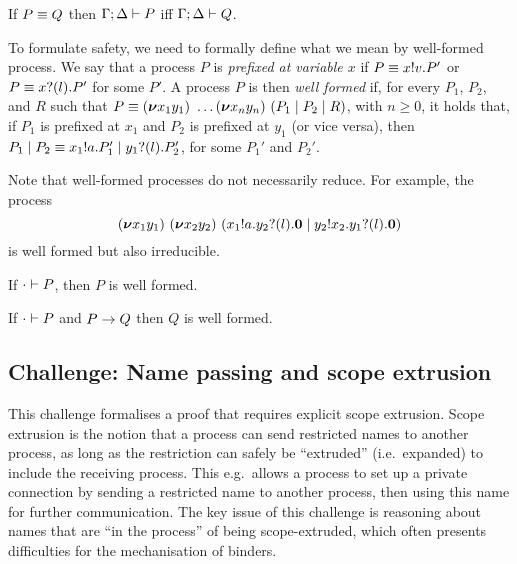 \documentclass[runningheads]{llncs}
\begin{document}
\begin{lemma}
  \label{le:presequiv}
    If \( P \equiv Q \) then \( \Gamma;\Delta \vdash P \)  iff \( \Gamma;\Delta \vdash Q \).
\end{lemma}

To formulate safety, we need to formally define what we mean by
well-formed process.  We say that a process \( P \) is \emph{prefixed
  at variable \( x \)} if \( P\equiv x ! v . P' \) or
\( P\equiv x ? (l) . P' \) for some $P'$.
%
A process $P$ is then \emph{well formed} if, for every $P_1$, $P_2$,
and $R$ such that
\( P\equiv (\bm{\nu} x_1y_1)~\dots
  (\bm{\nu} x_ny_n)~(P_1 \mid P_2 \mid R) \), with
\( n \geq 0 \), it holds that, if \( P_1 \) is prefixed at \( x_1 \)
and \( P_2 \) is prefixed at \( y_1 \) (or vice versa), then
\( P_1 \mid P_2
\equiv x_1 ! a . P_1' \mid y_1 ? (l) . P_2' \), for some
$P_1'$ and $P_2'$.

Note that well-formed processes do not necessarily reduce. For example, the process
\begin{equation*}
  (\bm{\nu} x_1y_1)~(\bm{\nu} x_2y_2)~(x_1 ! a . y_2 ? (l) . \bm{0} \mid y_2 ! x_2 . y_1 ? (l) . \bm{0})
\end{equation*}
is well formed but also irreducible.

\begin{theorem}
  \label{thm:type-safety}
  If \( \cdot \vdash P \), then \( P \) is well formed.
\end{theorem}

\begin{corollary}
  If \( \cdot \vdash P \) and \( P \rightarrow Q \) then \( Q \) is well formed.
\end{corollary}

\subsection{Challenge: Name passing and scope extrusion}
\label{sec:challenge:name-passing-scope-extrusion}

This challenge formalises a proof that requires explicit scope extrusion.
Scope extrusion is the notion that a process can send restricted names to another process, as long as the restriction can safely be ``extruded'' (i.e.\ expanded) to include the receiving process.
This e.g.\ allows a process to set up a private connection by sending a restricted name to another process, then using this name for further communication.
The key issue of this challenge is reasoning about names that are ``in the process'' of being scope-extruded, which often presents difficulties for the mechanisation of binders.
\end{document}
